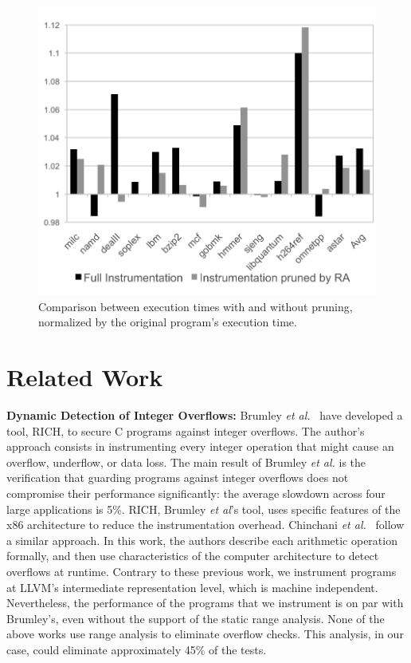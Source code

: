 \documentclass{sigplanconf}[10pt]
\begin{document}
\begin{figure}[t!]
\begin{center}
\includegraphics[width=\columnwidth]{images/spec_runtime}
\end{center}
\caption{\label{fig:spec_runtime}
Comparison between execution times with and without pruning, 
normalized by the original program's execution time.}
\end{figure}


\section{Related Work}
\label{sec:rel}

\noindent
\textbf{Dynamic Detection of Integer Overflows: }
Brumley {\em et al.}~\cite{Brumley07} have developed a tool, RICH, to
secure C programs against integer overflows.
The author's approach consists in instrumenting every integer operation that
might cause an overflow, underflow, or data loss.
The main result of Brumley {\em et al.} is the verification that guarding programs
against integer overflows does not compromise their
performance significantly: the average slowdown across four large applications
is 5\%.
RICH, Brumley {\em et al}'s tool, uses specific features of the x86 architecture
to reduce the instrumentation overhead.
Chinchani {\em et al.}~\cite{Chinchani04} follow a similar approach.
In this work, the authors describe each arithmetic operation formally, and then
use characteristics of the computer architecture to detect overflows at
runtime.
Contrary to these previous work, we instrument programs at LLVM's intermediate
representation level, which is machine independent.
Nevertheless, the performance of the programs that we instrument is on par with
Brumley's, even without the support of the static range analysis.
None of the above works use range analysis to eliminate overflow checks.
This analysis, in our case, could eliminate approximately 45\% of the
tests.
\end{document}
